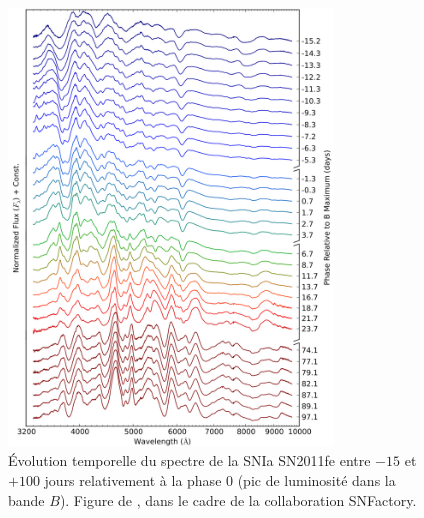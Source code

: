 \documentclass[../main/main.tex]{subfiles}
\begin{document}
\begin{figure}[ht]
  \centering
  \includegraphics[width=0.77\textwidth]{../figures/01bis_sne/sniaspecevol.pdf}
  \caption[\'Evolution temporelle du spectre de la SNIa
  SN2011fe.]{\'Evolution temporelle du spectre de la SNIa SN2011fe entre
  $-15$ et $+100$ jours relativement à la phase $0$ (pic de luminosité
  dans la bande $B$). Figure de \citet{Pereira2013}, dans le cadre de la
  collaboration SNFactory.}
  \label{fig:specevolsnia}
\end{figure}
\end{document}
